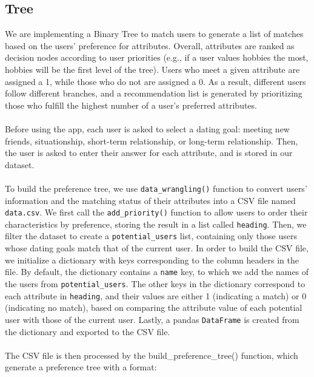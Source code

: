 \documentclass[fontsize=11pt]{article}
\begin{document}
\subsection*{Tree}
We are implementing a Binary Tree to match users to generate a list of matches based on the users’ preference for attributes. 
Overall, attributes are ranked as decision nodes according to user priorities (e.g., if a user values hobbies the most, hobbies will be the first level of the tree). 
Users who meet a given attribute are assigned a 1, while those who do not are assigned a 0. As a result, different users follow different branches, and a recommendation list is generated by prioritizing those who fulfill the highest number of a user's preferred attributes.
\\
\\
Before using the app, each user is asked to select a dating goal: meeting new friends, situationship, short-term relationship, or long-term relationship.
Then, the user is asked to enter their answer for each attribute, and is stored in our dataset.
\\
\\
To build the preference tree, we use \texttt{data\_wrangling()} function to convert users' information and the matching status 
of their attributes into a CSV file named \texttt{data.csv}. We first call the \texttt{add\_priority()} function to allow users to order their characteristics 
by preference, storing the result in a list called \texttt{heading}. Then, we filter the dataset to create a \texttt{potential\_users} list, containing only 
those users whose dating goals match that of the current user. In order to build the CSV file, we initialize a dictionary with keys corresponding to the column 
headers in the file. By default, the dictionary contains a \texttt{name} key, to which we add the names of the users from \texttt{potential\_users}. The other keys in 
the dictionary correspond to each attribute in \texttt{heading}, and their values are either 1 (indicating a match) or 0 (indicating no match), based on comparing the 
attribute value of each potential user with those of the current user. Lastly, a pandas \texttt{DataFrame} is created from the dictionary and exported to the CSV file.
\\
\\
The CSV file is then processed by the {build\_preference\_tree()} function, which generate a preference tree with a format:  
\end{document}
